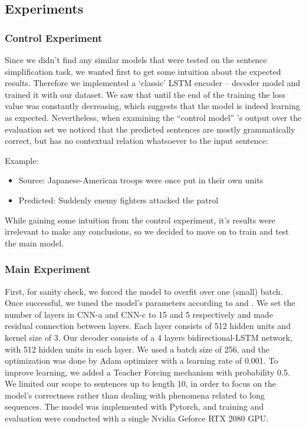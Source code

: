 \documentclass{article}
\begin{document}
\subsection{Experiments}
\subsubsection{Control Experiment}
Since we didn’t find any similar models that were tested on the sentence simplification task, we wanted first to get some intuition about the expected results. Therefore we implemented a ‘classic’ LSTM encoder – decoder model and trained it with our dataset. We saw that until the end of the training the loss value was constantly decreasing, which suggests that the model is indeed learning as expected. Nevertheless, when examining the “control model” ’s output over the evaluation set we noticed that the predicted sentences are mostly grammatically correct, but has no contextual relation whatsoever to the input sentence:
\begin{flushleft}
Example:
\begin{itemize}
\item Source: Japanese-American troops were once put in their own units
\item Predicted: Suddenly enemy fighters attacked the patrol
\end{itemize}
\end{flushleft}
While gaining some intuition from the control experiment, it’s results were irrelevant to make any conclusions, so we decided to move on to train and test the main model.


\subsubsection{Main Experiment}
First, for sanity check, we forced the model to overfit over one (small) batch.
Once successful, we tuned the model’s parameters according to \cite{DBLP:journals/corr/GehringAGD16} and \cite{neishi2017bag}. We set the number of layers in CNN-a and CNN-c to 15 and 5 respectively and made residual connection between layers. Each layer consists of 512 hidden units and kernel size of 3. Our decoder consists of a 4 layers bidirectional-LSTM network, with 512 hidden units in each layer.
We used a batch size of 256, and the optimization was done by Adam optimizer \cite{kingma2014adam} with a learning rate of 0.001. To improve learning, we added a Teacher Forcing mechanism \cite{doi:10.1162/neco.1989.1.2.270} with probability 0.5. We limited our scope to sentences up to length 10, in order to focus on the model’s correctness rather than dealing with phenomena related to long sequences. The model was implemented with Pytorch, and training and evaluation were conducted with a single Nvidia Geforce RTX 2080 GPU.
\end{document}
